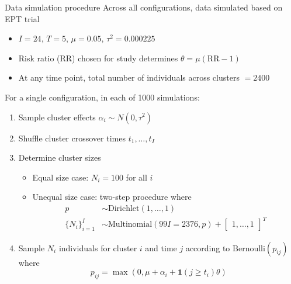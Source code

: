 \documentclass[9pt]{beamer}
\begin{document}
\begin{frame}{Data simulation procedure}
Across all configurations, data simulated based on EPT trial
\begin{itemize}

\item
$I=24$, $T=5$, $\mu=0.05$, $\tau^2=0.000225$

\item
Risk ratio (RR) chosen for study determines $\theta=\mu(\text{RR}-1)$

\item
At any time point, total number of individuals across clusters $= 2400$

\end{itemize}
\vspace{2em}

For a single configuration, in each of 1000 simulations:
\begin{enumerate}

\item
Sample cluster effects $\alpha_i\sim N(0,\tau^2)$

\item
Shuffle cluster crossover times $t_1,\ldots,t_I$

\item
Determine cluster sizes
\begin{itemize}
\item
Equal size case: $N_i=100$ for all $i$
\item
Unequal size case: two-step procedure where
\begin{align*}
p &\sim \text{Dirichlet}(1,\ldots,1) \\
\{N_i\}_{i=1}^I &\sim \text{Multinomial}(99I=2376,p) + \begin{bmatrix}1,\ldots,1\end{bmatrix}^T
\end{align*}
\end{itemize}

\item
Sample $N_i$ individuals for cluster $i$ and time $j$ according to $\text{Bernoulli}(p_{ij})$ where
\[
p_{ij} = \max(0,\mu+\alpha_i+\bm{1}(j\geq t_i)\theta)
\]

\end{enumerate}
\end{frame}
\end{document}
